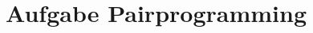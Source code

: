 \documentclass[12pt]{article}
\begin{document}
\tableofcontents
\pagebreak
\section{Aufgabe Pairprogramming}
\end{document}
